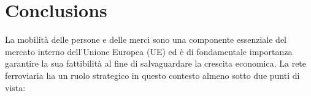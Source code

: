 \chapter{Conclusions}

\label{ch:conclusions}
La mobilità delle persone e delle merci sono una componente essenziale del mercato interno dell'Unione Europea (UE) ed è di fondamentale importanza garantire la sua fattibilità al fine di salvaguardare la crescita economica.
La rete ferroviaria ha un ruolo strategico in questo contesto almeno sotto due punti di vista:
